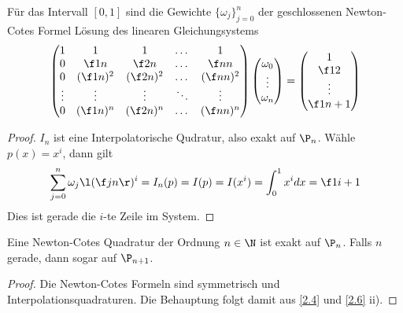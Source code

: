 \documentclass[11pt]{scrartcl}
\begin{document}
\begin{st}
	\label{2.10}
	Für das Intervall $[0,1]$ sind die Gewichte $\{\omega_j\}_{j=0}^n$ der geschlossenen Newton-Cotes Formel Lösung des linearen Gleichungsystems
	\[
		\begin{pmatrix}
			1 & 1 & 1 & \dotsc & 1 \\
			0 & \f 1n & \f 2n & \dotsc & \f nn \\
			0 & (\f 1n)^2 & (\f 2n)^2 & \dotsc & (\f nn)^2 \\
			\vdots & \vdots & \vdots & \ddots & \vdots \\
			0 & (\f 1n)^n & (\f 2n)^n & \dotsc & (\f nn)^n \\
		\end{pmatrix}
		\begin{pmatrix}
			\omega_0 \\
			\vdots \\
			\omega_n
		\end{pmatrix}
		=
		\begin{pmatrix}
			1 \\ \f 12 \\ \vdots \\ \f 1{n+1}
		\end{pmatrix}
	\]
	\begin{proof}
		$I_n$ ist eine Interpolatorische Qudratur, also exakt auf $\P_n$.
		Wähle $p(x) = x^i$, dann gilt
		\[
			\sum_{j=0}^n \omega_j \l( \f jn \r)^i = I_n(p) = I(p) = I(x^i) = \int_0^1 x^i dx = \f 1{i+1}
		\]
		Dies ist gerade die $i$-te Zeile im System.
	\end{proof}
\end{st}

\begin{kor}
	\label{2.11}
	Eine Newton-Cotes Quadratur der Ordnung $n\in \N$ ist exakt auf $\P_n$.
	Falls $n$ gerade, dann sogar auf $\P_{n+1}$.
	\begin{proof}
		Die Newton-Cotes Formeln sind symmetrisch und Interpolationsquadraturen.
		Die Behauptung folgt damit aus \ref{2.4} und \ref{2.6} ii).
	\end{proof}
\end{kor}
\end{document}
